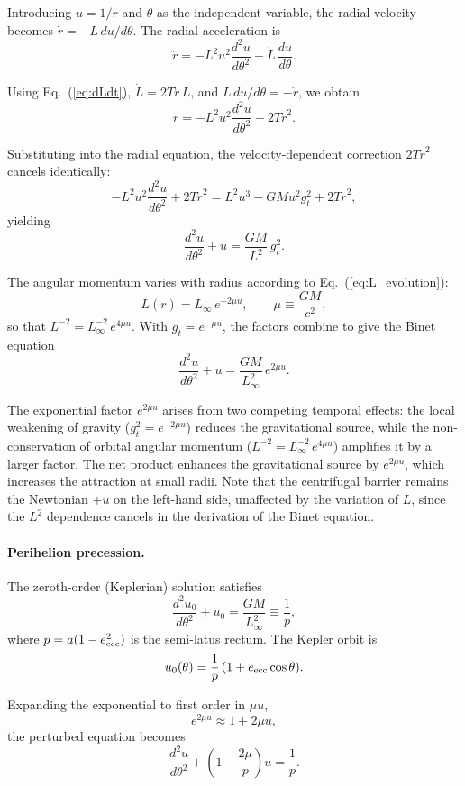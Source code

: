 \documentclass[12pt]{article}
\begin{document}
Introducing $u = 1/r$ and $\theta$ as the independent variable, the radial velocity becomes $\dot{r} = -L\, du/d\theta$. The radial acceleration is
$$
\ddot{r} = -L^2 u^2 \frac{d^2 u}{d\theta^2}
         - \dot{L}\,\frac{du}{d\theta} .
$$

Using Eq.~(\ref{eq:dLdt}), $\dot{L} = 2T\dot{r}\,L$, and $L\,du/d\theta = -\dot{r}$, we obtain
$$
\ddot{r} = -L^2 u^2 \frac{d^2 u}{d\theta^2} + 2T\dot{r}^2 .
$$

Substituting into the radial equation, the velocity-dependent correction $2T\dot{r}^2$ cancels identically:
$$
-L^2 u^2 \frac{d^2 u}{d\theta^2} + 2T\dot{r}^2
= L^2 u^3 - GM u^2 g_t^2 + 2T\dot{r}^2 ,
$$
yielding
\begin{equation}
\frac{d^2 u}{d\theta^2} + u = \frac{GM}{L^2}\,g_t^2 .
\end{equation}

The angular momentum varies with radius according to Eq.~(\ref{eq:L_evolution}):
$$
L(r) = L_\infty\,e^{-2\mu u}, \qquad \mu \equiv \frac{GM}{c^2} ,
$$
so that $L^{-2} = L_\infty^{-2}\,e^{4\mu u}$. With $g_t = e^{-\mu u}$, the factors combine to give the Binet equation
$$
\frac{d^2 u}{d\theta^2} + u
= \frac{GM}{L_\infty^2}\,e^{2\mu u} .
\label{eq:binet_tff}
$$

The exponential factor $e^{2\mu u}$ arises from two competing temporal effects: the local weakening of gravity ($g_t^2 = e^{-2\mu u}$) reduces the gravitational source, while the non-conservation of orbital angular momentum ($L^{-2} = L_\infty^{-2}\,e^{4\mu u}$) amplifies it by a larger factor. The net product enhances the gravitational source by $e^{2\mu u}$, which increases the attraction at small radii. Note that the centrifugal barrier remains the Newtonian $+u$ on the left-hand side, unaffected by the variation of $L$, since the $L^2$ dependence cancels in the derivation of the Binet equation.

\paragraph{Perihelion precession.}
The zeroth-order (Keplerian) solution satisfies
$$
\frac{d^2 u_0}{d\theta^2} + u_0 = \frac{GM}{L_\infty^2}
\equiv \frac{1}{p} ,
$$
where $p = a(1-e_{\rm ecc}^2)$ is the semi-latus rectum. The Kepler
orbit is
$$
u_0(\theta) = \frac{1}{p}\,(1 + e_{\rm ecc}\cos\theta) .
$$

Expanding the exponential to first order in $\mu u$,
$$
e^{2\mu u} \approx 1 + 2\mu u ,
$$
the perturbed equation becomes
$$
\frac{d^2 u}{d\theta^2} + \left(1 - \frac{2\mu}{p}\right)u
= \frac{1}{p} .
$$
\end{document}
